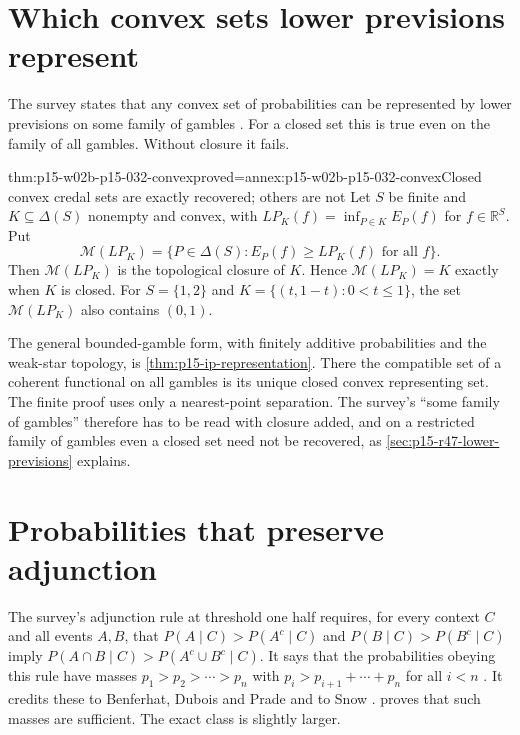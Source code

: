 \section{Which convex sets lower previsions represent}
\label{sec:p15-w02b-p15-032-convex}

The survey states that any convex set of probabilities can be represented
by lower previsions on some family of gambles
\cite[p.~312]{DuboisPrade2021RepresentingBelief}. For a closed set this is
true even on the family of all gambles. Without closure it fails.

\begin{hbtheorem}{thm:p15-w02b-p15-032-convex}{proved=annex:p15-w02b-p15-032-convex}{Closed convex credal sets are exactly recovered; others are not}
Let \(S\) be finite and \(K\subseteq\Delta(S)\) nonempty and convex, with
\(LP_K(f)=\inf_{P\in K}E_P(f)\) for \(f\in\mathbb R^S\). Put
\[
 \mathcal M(LP_K)=\{P\in\Delta(S):E_P(f)\geq LP_K(f)\text{ for all }f\}.
\]
Then \(\mathcal M(LP_K)\) is the topological closure of \(K\). Hence
\(\mathcal M(LP_K)=K\) exactly when \(K\) is closed. For \(S=\{1,2\}\)
and \(K=\{(t,1-t):0<t\leq1\}\), the set \(\mathcal M(LP_K)\) also contains
\((0,1)\).
\end{hbtheorem}

The general bounded-gamble form, with finitely additive probabilities and
the weak-star topology, is \cref{thm:p15-ip-representation}. There the
compatible set of a coherent functional on all gambles is its unique
closed convex representing set. The finite proof uses only a nearest-point
separation. The survey's ``some family of gambles'' therefore has to be
read with closure added, and on a restricted family of gambles even a
closed set need not be recovered, as \cref{sec:p15-r47-lower-previsions}
explains.

\section{Probabilities that preserve adjunction}
\label{sec:p15-w02b-p15-032-big-stepped}

The survey's adjunction rule at threshold one half requires, for every
context \(C\) and all events \(A,B\), that \(P(A\mid C)>P(A^c\mid C)\) and
\(P(B\mid C)>P(B^c\mid C)\) imply \(P(A\cap B\mid C)>P(A^c\cup B^c\mid C)\). It
says that the probabilities obeying this rule have masses
\(p_1>p_2>\cdots>p_n\) with \(p_i>p_{i+1}+\cdots+p_n\) for all \(i<n\)
\cite[p.~308]{DuboisPrade2021RepresentingBelief}. It credits these to
Benferhat, Dubois and Prade and to Snow
\cite{R47BenferhatDuboisPrade1999,R47Snow1999}. 
proves that such masses are sufficient. The exact class is slightly larger.

